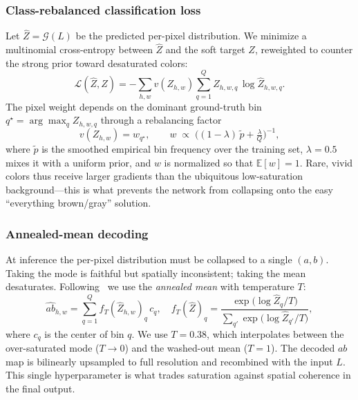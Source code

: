 \subsubsection{Class-rebalanced classification loss}
Let $\widehat{Z}=\mathcal{G}(L)$ be the predicted per-pixel distribution. We
minimize a multinomial cross-entropy between $\widehat{Z}$ and the soft target
$Z$, reweighted to counter the strong prior toward desaturated colors:
\begin{equation}
  \mathcal{L}(\widehat{Z}, Z) =
  -\sum_{h,w} v\!\left(Z_{h,w}\right)
  \sum_{q=1}^{Q} Z_{h,w,q}\,\log \widehat{Z}_{h,w,q}.
  \label{eq:loss}
\end{equation}
The pixel weight depends on the dominant ground-truth bin
$q^{\star}=\arg\max_q Z_{h,w,q}$ through a rebalancing factor
\begin{equation}
  v(Z_{h,w}) = w_{q^{\star}},\qquad
  w \;\propto\; \Big((1-\lambda)\,\widetilde{p} + \tfrac{\lambda}{Q}\Big)^{-1},
  \label{eq:rebalance}
\end{equation}
where $\widetilde{p}$ is the smoothed empirical bin frequency over the training
set, $\lambda=0.5$ mixes it with a uniform prior, and $w$ is normalized so that
$\mathbb{E}[w]=1$. Rare, vivid colors thus receive larger gradients than the
ubiquitous low-saturation background---this is what prevents the network from
collapsing onto the easy ``everything brown/gray'' solution.

\subsubsection{Annealed-mean decoding}
At inference the per-pixel distribution must be collapsed to a single $(a,b)$.
Taking the mode is faithful but spatially inconsistent; taking the mean
desaturates. Following~\cite{zhang2016colorful} we use the \emph{annealed mean}
with temperature $T$:
\begin{equation}
  \widehat{ab}_{h,w} = \sum_{q=1}^{Q} f_T\!\left(\widehat{Z}_{h,w}\right)_q\, c_q,
  \quad
  f_T(\widehat{Z})_q = \frac{\exp\!\big(\log \widehat{Z}_q / T\big)}
                            {\sum_{q'} \exp\!\big(\log \widehat{Z}_{q'} / T\big)},
  \label{eq:annealed}
\end{equation}
where $c_q$ is the center of bin $q$. We use $T=0.38$, which interpolates
between the over-saturated mode ($T\!\to\!0$) and the washed-out mean
($T\!=\!1$). The decoded $ab$ map is bilinearly upsampled to full resolution
and recombined with the input $L$. This single hyperparameter is what trades
saturation against spatial coherence in the final output.

